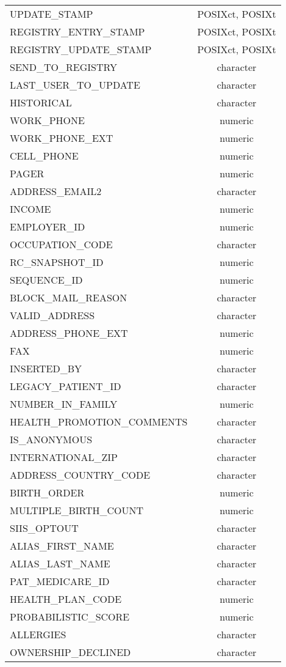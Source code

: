 \documentclass[
  letterpaper,
  DIV=11,
  numbers=noendperiod]{scrreprt}
\begin{document}
\begin{longtable}{lc}
UPDATE\_STAMP & POSIXct, POSIXt \\ 
REGISTRY\_ENTRY\_STAMP & POSIXct, POSIXt \\ 
REGISTRY\_UPDATE\_STAMP & POSIXct, POSIXt \\ 
SEND\_TO\_REGISTRY & character \\ 
LAST\_USER\_TO\_UPDATE & character \\ 
HISTORICAL & character \\ 
WORK\_PHONE & numeric \\ 
WORK\_PHONE\_EXT & numeric \\ 
CELL\_PHONE & numeric \\ 
PAGER & numeric \\ 
ADDRESS\_EMAIL2 & character \\ 
INCOME & numeric \\ 
EMPLOYER\_ID & numeric \\ 
OCCUPATION\_CODE & character \\ 
RC\_SNAPSHOT\_ID & numeric \\ 
SEQUENCE\_ID & numeric \\ 
BLOCK\_MAIL\_REASON & character \\ 
VALID\_ADDRESS & character \\ 
ADDRESS\_PHONE\_EXT & numeric \\ 
FAX & numeric \\ 
INSERTED\_BY & character \\ 
LEGACY\_PATIENT\_ID & character \\ 
NUMBER\_IN\_FAMILY & numeric \\ 
HEALTH\_PROMOTION\_COMMENTS & character \\ 
IS\_ANONYMOUS & character \\ 
INTERNATIONAL\_ZIP & character \\ 
ADDRESS\_COUNTRY\_CODE & character \\ 
BIRTH\_ORDER & numeric \\ 
MULTIPLE\_BIRTH\_COUNT & numeric \\ 
SIIS\_OPTOUT & character \\ 
ALIAS\_FIRST\_NAME & character \\ 
ALIAS\_LAST\_NAME & character \\ 
PAT\_MEDICARE\_ID & character \\ 
HEALTH\_PLAN\_CODE & numeric \\ 
PROBABILISTIC\_SCORE & numeric \\ 
ALLERGIES & character \\ 
OWNERSHIP\_DECLINED & character \\ 

\end{longtable}
\end{document}
